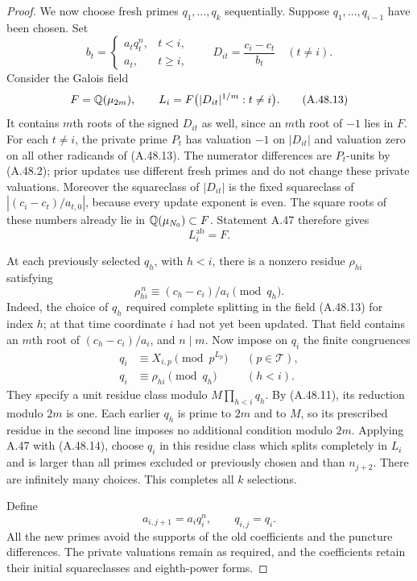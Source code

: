 \begin{proof}
We now choose fresh primes $q_1,\ldots,q_k$
sequentially. Suppose $q_1,\ldots,q_{i-1}$
have been chosen. Set
\[
 b_t=\begin{cases}
          a_tq_t^n,&t<i,\\
          a_t,&t\ge i,
       \end{cases}
 \qquad
 D_{it}=\frac{c_i-c_t}{b_t}\quad(t\ne i).
 \tag{A.48.12}
\]
Consider the Galois field
\[
 F=\mathbb Q(\mu_{2m}),\qquad
 L_i=F\bigl(|D_{it}|^{1/m}:t\ne i\bigr).
 \tag{A.48.13}
\]
It contains $m$th roots of the signed $D_{it}$
as well, since an $m$th root of $-1$ lies in $F$.
For each $t\ne i$, the private prime $P_t$
has valuation $-1$ on $|D_{it}|$ and valuation
zero on all other radicands of (A.48.13).
The numerator differences are $P_t$-units by
(A.48.2); prior updates use different fresh
primes and do not change these private valuations.
Moreover the squareclass of $|D_{it}|$ is the
fixed squareclass of $|(c_i-c_t)/a_{t,0}|$,
because every update exponent is even.
The square roots of these numbers already lie
in $\mathbb Q(\mu_{N_0})\subset F$. Statement A.47
therefore gives
\[
                        L_i^{\mathrm{ab}}=F.
 \tag{A.48.14}
\]

At each previously selected $q_h$, with $h<i$,
there is a nonzero residue $\rho_{hi}$ satisfying
\[
              \rho_{hi}^{\,n}
                    \equiv(c_h-c_i)/a_i\pmod {q_h}.
 \tag{A.48.15}
\]
Indeed, the choice of $q_h$ required complete
splitting in the field (A.48.13) for index $h$;
at that time coordinate $i$ had not yet been
updated. That field contains an $m$th root of
$(c_h-c_i)/a_i$, and $n\mid m$.
Now impose on $q_i$ the finite congruences
\[
 \begin{aligned}
 q_i&\equiv X_{i,p}\pmod {p^{L_p}}
                         &&(p\in\mathcal T),\\
 q_i&\equiv\rho_{hi}\pmod {q_h}
                         &&(h<i).
 \end{aligned}
 \tag{A.48.16}
\]
They specify a unit residue class modulo
$M\prod_{h<i}q_h$. By (A.48.11), its reduction
modulo $2m$ is one. Each earlier $q_h$ is prime
to $2m$ and to $M$, so its prescribed residue
in the second line imposes no additional
condition modulo $2m$. Applying A.47 with
(A.48.14), choose $q_i$ in this residue class
which splits completely in $L_i$ and is larger
than all primes excluded or previously chosen
and than $n_{j+2}$. There are infinitely many
choices. This completes all $k$ selections.

Define
\[
                 a_{i,j+1}=a_iq_i^n,\qquad
                 q_{i,j}=q_i.
 \tag{A.48.17}
\]
All the new primes avoid the supports of the
old coefficients and the puncture differences.
The private valuations remain as required,
and the coefficients retain their initial
squareclasses and eighth-power forms.


\end{proof}
